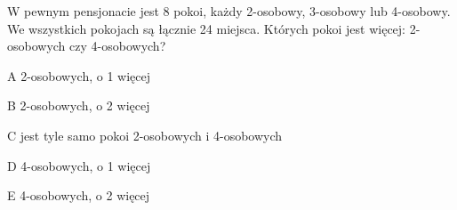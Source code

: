 \begin{tresc}
W pewnym pensjonacie jest 8 pokoi, każdy 2-osobowy, 3-osobowy lub 4-osobowy. We wszystkich pokojach są łącznie 24 miejsca. Których pokoi jest więcej: 2-osobowych czy 4-osobowych?
\end{tresc}
\begin{wariant}{A} 2-osobowych, o 1 więcej \end{wariant}
\begin{wariant}{B} 2-osobowych, o 2 więcej \end{wariant}
\begin{wariant}{C} jest tyle samo pokoi 2-osobowych i 4-osobowych \end{wariant}
\begin{wariant}{D} 4-osobowych, o 1 więcej \end{wariant}
\begin{wariant}{E} 4-osobowych, o 2 więcej \end{wariant}
